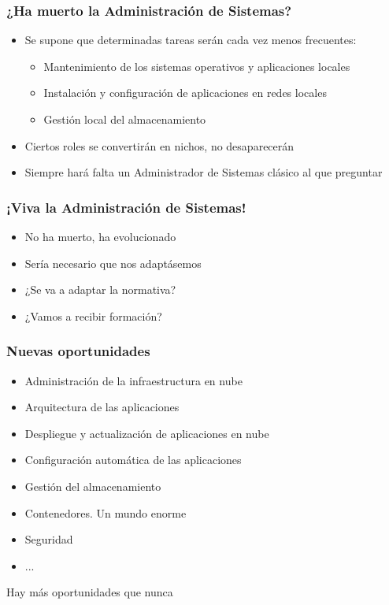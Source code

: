 \documentclass[aspectratio=169]{beamer}
\begin{document}
\begin{frame}
  \frametitle{¿Ha muerto la Administración de Sistemas?}
  \begin{itemize}
  \item Se supone que determinadas tareas serán cada vez menos frecuentes:
    \begin{itemize}
    \item Mantenimiento de los sistemas operativos y aplicaciones locales
    \item Instalación y configuración de aplicaciones en redes locales
    \item Gestión local del almacenamiento
    \end{itemize}
  \item Ciertos roles se convertirán en nichos, no desaparecerán
  \item Siempre hará falta un Administrador de Sistemas clásico al que preguntar
  \end{itemize}
\end{frame}

\begin{frame}
  \frametitle{¡Viva la Administración de Sistemas!}
  \begin{itemize}
  \item No ha muerto, ha evolucionado
  \item Sería necesario que nos adaptásemos
  \item ¿Se va a adaptar la normativa?
  \item ¿Vamos a recibir formación?
  \end{itemize}
\end{frame}

\begin{frame}
  \frametitle{Nuevas oportunidades}
  \begin{itemize}
  \item Administración de la infraestructura en nube
  \item Arquitectura de las aplicaciones
  \item Despliegue y actualización de aplicaciones en nube
  \item Configuración automática de las aplicaciones
  \item Gestión del almacenamiento
  \item Contenedores. Un mundo enorme
  \item Seguridad
  \item ...
  \end{itemize}
Hay más oportunidades que nunca
\end{frame}
\end{document}
